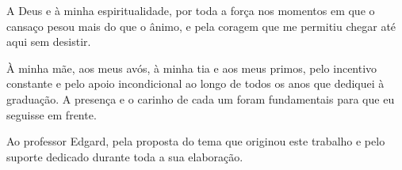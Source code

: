 
\begin{agradecimentos}

A Deus e à minha espiritualidade, por toda a força nos momentos em que
o cansaço pesou mais do que o ânimo, e pela coragem que me permitiu
chegar até aqui sem desistir.

À minha mãe, aos meus avós, à minha tia e aos meus primos, pelo
incentivo constante e pelo apoio incondicional ao longo de todos os anos
que dediquei à graduação. A presença e o carinho de cada um foram
fundamentais para que eu seguisse em frente.

Ao professor Edgard, pela proposta do tema que originou este trabalho e
pelo suporte dedicado durante toda a sua elaboração.

\end{agradecimentos}